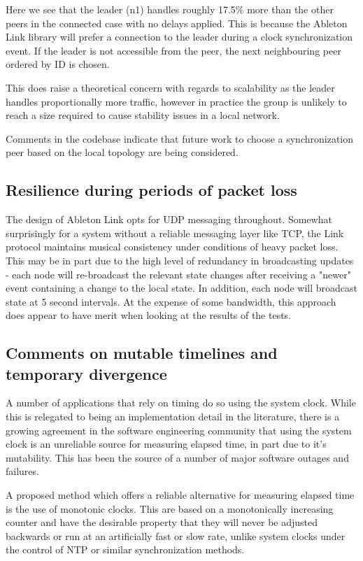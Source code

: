 \documentclass[11pt]{article} %
\theoremstyle{plain}
\theoremstyle{definition}
\begin{document}
Here we see that the leader (n1) handles roughly 17.5\% more than the other
peers in the connected case with no delays applied. This is because the Ableton
Link library will prefer a connection to the leader during a clock
synchronization event. If the leader is not accessible from the peer, the next
neighbouring peer ordered by ID is chosen.

This does raise a theoretical concern with regards to scalability as the leader
handles proportionally more traffic, however in practice the group is unlikely
to reach a size required to cause stability issues in a local network.

Comments in the codebase indicate that future work to choose a synchronization
peer based on the local topology are being considered.

\subsection{Resilience during periods of packet loss}

The design of Ableton Link opts for UDP messaging throughout. Somewhat
surprisingly for a system without a reliable messaging layer like TCP, the Link
protocol maintains musical consistency under conditions of heavy packet loss.
This may be in part due to the high level of redundancy in broadcasting updates
- each node will re-broadcast the relevant state changes after receiving a
"newer" event containing a change to the local state. In addition, each node
will broadcast state at 5 second intervals. At the expense of some bandwidth,
this approach does appear to have merit when looking at the results of the tests.

\subsection{Comments on mutable timelines and temporary divergence}

A number of applications that rely on timing do so using the system clock.
While this is relegated to being an implementation detail in the literature,
there is a growing agreement in the software engineering community that using
the system clock is an unreliable source for measuring elapsed time, in part
due to it's mutability. This has been the source of a number of major software
outages and failures\cite{monotonic}.

A proposed method which offers a reliable alternative for measuring elapsed
time is the use of monotonic clocks. This are based on a monotonically
increasing counter and have the desirable property that they will never be
adjusted backwards or run at an artificially fast or slow rate, unlike system
clocks under the control of NTP or similar synchronization methods.
\end{document}
